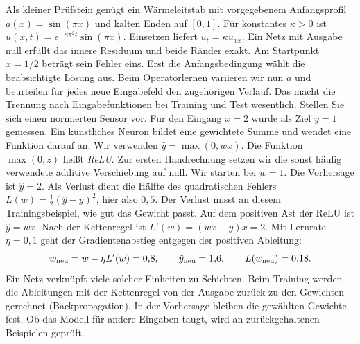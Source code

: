 Als kleiner Prüfstein genügt ein Wärmeleitstab mit vorgegebenem Anfangsprofil \(a(x)=\sin(\pi x)\) und kalten Enden auf \([0,1]\). Für konstantes \(\kappa>0\) ist \(u(x,t)=e^{-\kappa\pi^2t}\sin(\pi x)\). Einsetzen liefert \(u_t=\kappa u_{xx}\). Ein Netz mit Ausgabe null erfüllt das innere Residuum und beide Ränder exakt. Am Startpunkt \(x=1/2\) beträgt sein Fehler eins. Erst die Anfangsbedingung wählt die beabsichtigte Lösung aus. Beim Operatorlernen variieren wir nun \(a\) und beurteilen für jedes neue Eingabefeld den zugehörigen Verlauf. Das macht die Trennung nach Eingabefunktionen bei Training und Test wesentlich.
Stellen Sie sich einen normierten Sensor vor. Für den Eingang \(x=2\) wurde als Ziel \(y=1\) gemessen. Ein künstliches Neuron bildet eine gewichtete Summe und wendet eine Funktion darauf an. Wir verwenden \(\hat y=\max(0,wx)\). Die Funktion \(\max(0,z)\) heißt \emph{ReLU}. Zur ersten Handrechnung setzen wir die sonst häufig verwendete additive Verschiebung auf null.
Wir starten bei \(w=1\). Die Vorhersage ist \(\hat y=2\). Als Verlust dient die Hälfte des quadratischen Fehlers \(L(w)=\tfrac12(\hat y-y)^2\), hier also \(0{,}5\). Der Verlust misst an diesem Trainingsbeispiel, wie gut das Gewicht passt.
Auf dem positiven Ast der ReLU ist \(\hat y=wx\). Nach der Kettenregel ist \(L'(w)=(wx-y)x=2\). Mit Lernrate \(\eta=0{,}1\) geht der Gradientenabstieg entgegen der positiven Ableitung:
\[
 w_{\rm neu}=w-\eta L'(w)=0{,}8,\qquad
 \hat y_{\rm neu}=1{,}6,\qquad L(w_{\rm neu})=0{,}18 .
\]
Ein Netz verknüpft viele solcher Einheiten zu Schichten. Beim Training werden die Ableitungen mit der Kettenregel von der Ausgabe zurück zu den Gewichten gerechnet (Backpropagation). In der Vorhersage bleiben die gewählten Gewichte fest. Ob das Modell für andere Eingaben taugt, wird an zurückgehaltenen Beispielen geprüft.

